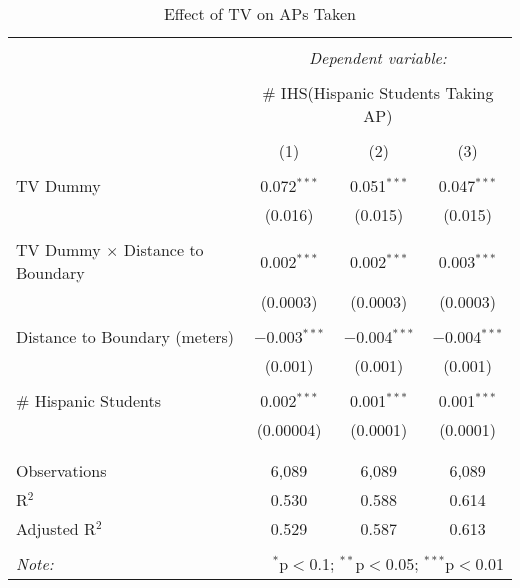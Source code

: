 
\begin{table}[!htbp] \centering 
  \caption{Effect of TV on APs Taken} 
  \label{} 
\begin{tabular}{@{\extracolsep{-2pt}}lccc} 
\\[-1.8ex]\hline 
\hline \\[-1.8ex] 
 & \multicolumn{3}{c}{\textit{Dependent variable:}} \\ 
\cline{2-4} 
\\[-1.8ex] & \multicolumn{3}{c}{\# IHS(Hispanic Students Taking AP)} \\ 
\\[-1.8ex] & (1) & (2) & (3)\\ 
\hline \\[-1.8ex] 
 TV Dummy & 0.072$^{***}$ & 0.051$^{***}$ & 0.047$^{***}$ \\ 
  & (0.016) & (0.015) & (0.015) \\ 
  & & & \\ 
 TV Dummy $\times$ Distance to Boundary & 0.002$^{***}$ & 0.002$^{***}$ & 0.003$^{***}$ \\ 
  & (0.0003) & (0.0003) & (0.0003) \\ 
  & & & \\ 
 Distance to Boundary (meters) & $-$0.003$^{***}$ & $-$0.004$^{***}$ & $-$0.004$^{***}$ \\ 
  & (0.001) & (0.001) & (0.001) \\ 
  & & & \\ 
 \# Hispanic Students & 0.002$^{***}$ & 0.001$^{***}$ & 0.001$^{***}$ \\ 
  & (0.00004) & (0.0001) & (0.0001) \\ 
  & & & \\ 
\hline \\[-1.8ex] 
Observations & 6,089 & 6,089 & 6,089 \\ 
R$^{2}$ & 0.530 & 0.588 & 0.614 \\ 
Adjusted R$^{2}$ & 0.529 & 0.587 & 0.613 \\ 
\hline 
\hline \\[-1.8ex] 
\textit{Note:}  & \multicolumn{3}{r}{$^{*}$p$<$0.1; $^{**}$p$<$0.05; $^{***}$p$<$0.01} \\ 
\end{tabular} 
\end{table} 
